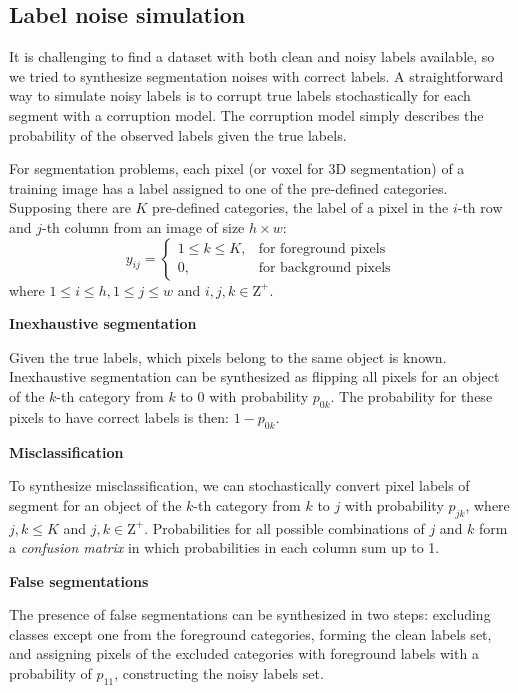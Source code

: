 \subsection{Label noise simulation}
\label{subsec:noises}

It is challenging to find a dataset with both clean and noisy labels available, so we tried to synthesize segmentation noises with correct labels.
A straightforward way to simulate noisy labels is to corrupt true labels stochastically for each segment with a corruption model.
The corruption model simply describes the probability of the observed labels given the true labels.

For segmentation problems, each pixel (or voxel for 3D segmentation) of a training image has a label assigned to one of the pre-defined categories.
Supposing there are $K$ pre-defined categories, the label of a pixel in the $i$-th row and $j$-th column from an image of size $h \times w$:
\[
  y_{ij} =
    \begin{cases}
      1 \leq k \leq K, & \text{for foreground pixels} \\
      0, & \text{for background pixels}
    \end{cases}
\]
where $1 \leq i \leq h, 1 \leq j \leq w$ and $i,j,k \in \mathrm{Z}^+$.


\textbf{Inexhaustive segmentation}

Given the true labels, which pixels belong to the same object is known.
Inexhaustive segmentation can be synthesized as flipping all pixels for an object of the $k$-th category from $k$ to $0$ with probability $p_{0k}$.
The probability for these pixels to have correct labels is then: $1-p_{0k}$.


\textbf{Misclassification}

To synthesize misclassification, we can stochastically convert pixel labels of segment for an object of the $k$-th category from $k$ to $j$ with probability $p_{jk}$, where $j, k \leq K$ and $j,k \in \mathrm{Z}^+$.
Probabilities for all possible combinations of $j$ and $k$ form a \textit{confusion matrix} in which probabilities in each column sum up to 1.

\textbf{False segmentations}

The presence of false segmentations can be synthesized in two steps: excluding classes except one from the foreground categories, forming the clean labels set, and assigning pixels of the excluded categories with foreground labels with a probability of $p_{11}$, constructing the noisy labels set.%
